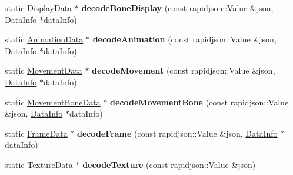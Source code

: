 \begin{DoxyCompactItemize}
\item 
\mbox{\label{classcocostudio_1_1DataReaderHelper_a1726670398ef467d31ffbde2468290c8}} 
static \hyperlink{classcocostudio_1_1DisplayData}{Display\+Data} $\ast$ {\bfseries decode\+Bone\+Display} (const rapidjson\+::\+Value \&json, \hyperlink{structcocostudio_1_1DataReaderHelper_1_1__DataInfo}{Data\+Info} $\ast$data\+Info)
\item 
\mbox{\label{classcocostudio_1_1DataReaderHelper_a0be6f841ea183eeacbb9fe616d306bd6}} 
static \hyperlink{classcocostudio_1_1AnimationData}{Animation\+Data} $\ast$ {\bfseries decode\+Animation} (const rapidjson\+::\+Value \&json, \hyperlink{structcocostudio_1_1DataReaderHelper_1_1__DataInfo}{Data\+Info} $\ast$data\+Info)
\item 
\mbox{\label{classcocostudio_1_1DataReaderHelper_a8590abc44f6c0c3d4a7a40e2a7e9c282}} 
static \hyperlink{classcocostudio_1_1MovementData}{Movement\+Data} $\ast$ {\bfseries decode\+Movement} (const rapidjson\+::\+Value \&json, \hyperlink{structcocostudio_1_1DataReaderHelper_1_1__DataInfo}{Data\+Info} $\ast$data\+Info)
\item 
\mbox{\label{classcocostudio_1_1DataReaderHelper_ad3e7cd39742220be7fb652b7e8292db5}} 
static \hyperlink{classcocostudio_1_1MovementBoneData}{Movement\+Bone\+Data} $\ast$ {\bfseries decode\+Movement\+Bone} (const rapidjson\+::\+Value \&json, \hyperlink{structcocostudio_1_1DataReaderHelper_1_1__DataInfo}{Data\+Info} $\ast$data\+Info)
\item 
\mbox{\label{classcocostudio_1_1DataReaderHelper_a038fa20bab38ac32084e5033276ec6b7}} 
static \hyperlink{classcocostudio_1_1FrameData}{Frame\+Data} $\ast$ {\bfseries decode\+Frame} (const rapidjson\+::\+Value \&json, \hyperlink{structcocostudio_1_1DataReaderHelper_1_1__DataInfo}{Data\+Info} $\ast$data\+Info)
\item 
\mbox{\label{classcocostudio_1_1DataReaderHelper_a32495f5202d2789227a61ccae029b39f}} 
static \hyperlink{classcocostudio_1_1TextureData}{Texture\+Data} $\ast$ {\bfseries decode\+Texture} (const rapidjson\+::\+Value \&json)

\end{DoxyCompactItemize}
